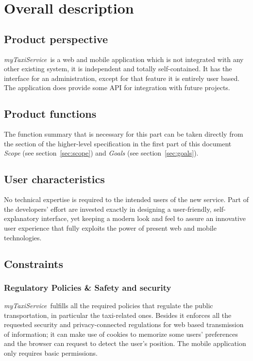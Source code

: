 \documentclass[a4paper,11pt]{report} %
\newcommand{\mts}{\mbox{\normalfont\itshape myTaxiService\ }}
\begin{document}
	\pagebreak %
	
	\section{Overall description}
	
	\subsection{Product perspective} \mts is a web and mobile application which is not integrated with	any other existing system, it is independent and totally self-contained. It has the interface for an administration, except for that feature it is entirely user based. The application does provide some API for integration with future projects.
	
	\subsection{Product functions} The function summary that is necessary for this part can be taken directly from the section of the higher-level specification in the first part of this document {\em Scope} (see section~\ref{sec:scope}) and {\em Goals} (see section~\ref{sec:goals}).
	
	\subsection{User characteristics} No technical expertise is required to the intended users of the new service. Part of the developers' effort are invested exactly in designing a user-friendly, self-explanatory interface, yet keeping a modern look and feel to assure an innovative user experience that fully exploits the power of present web and mobile technologies.  
	
	\subsection{Constraints}
	
	\subsubsection{Regulatory Policies \& Safety and security} \mts fulfills all the required policies that regulate the public transportation, in particular the taxi-related ones. Besides it enforces all the requested security and privacy-connected regulations for web based transmission of information; it can make use of cookies to memorize some users' preferences and the browser can request to detect the user's position. The mobile application only requires basic permissions. 
	
\end{document}

